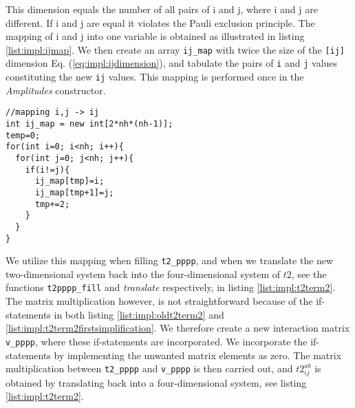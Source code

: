 This dimension equals the number of all pairs of i and j, where i and j are different. If i and j are equal it violates the Pauli exclusion principle. The mapping of i and j into one variable is obtained as illustrated in listing \ref{list:impl:ijmap}. We then create an array \texttt{ij\_map} with twice the size of the \texttt{[ij]} dimension Eq. (\ref{eq:impl:ijdimension}), and tabulate the pairs of \texttt{i} and \texttt{j} values constituting the new \texttt{ij} values. This mapping is performed once in the \emph{Amplitudes} constructor.
\begin{lstlisting}[label={list:impl:ijmap},caption={Illustrates the map of the two quantum numbers i,j into one number ij}]
//mapping i,j -> ij  
int ij_map = new int[2*nh*(nh-1)];
temp=0;
for(int i=0; i<nh; i++){
  for(int j=0; j<nh; j++){
    if(i!=j){
      ij_map[tmp]=i;
      ij_map[tmp+1]=j;
      tmp+=2;
    }
  }
}
\end{lstlisting}
We utilize this mapping when filling \texttt{t2\_pppp}, and when we translate the new two-dimensional system back into the four-dimensional system of $t2$, see the functions \texttt{t2pppp\_fill} and \emph{translate} respectively, in listing \ref{list:impl:t2term2}. The matrix multiplication however, is not straightforward because of the if-statements in both listing \ref{list:impl:oldt2term2} and \ref{list:impl:t2term2firstsimplification}. We therefore create a new interaction matrix \texttt{v\_pppp}, where these if-statements are incorporated. We incorporate the if-statements by implementing the unwanted matrix elements as zero. The matrix multiplication between \texttt{t2\_pppp} and \texttt{v\_pppp} is then carried out, and $t2_{ij}^{ab}$ is obtained by translating back into a four-dimensional system, see listing \ref{list:impl:t2term2}.

